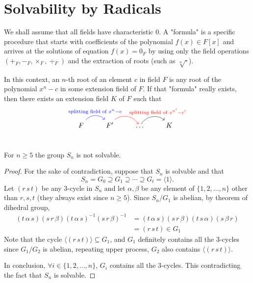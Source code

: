 \section{Solvability by Radicals}

We shall assume that all fields have characteristic $0$. A "formula" is a specific procedure 
that starts with coefficients of the polynomial $f(x) \in F[x]$ and arrives at the solutions of equation
$f(x) = 0_F$ by using only the field operations $(+_F, -_F, \times_F, \div_F)$ and the extraction 
of roots (such as $\sqrt[n]{\cdot}$).

In this context, an $n$-th root of an element $c$ in field $F$ is any root of the polynomial 
$x^n - c$ in some extension field of $F$. If that "formula" really exists, then there exists 
an extension field $K$ of $F$ such that 
\[
    \begin{tikzcd}
        F \arrow[r, blue, bend left=50, "\text{splitting field of } x^n - c"] & F' \arrow[r, red, bend left=50, "\text{splitting field of } x^{n'} - c'"]& \ldots \arrow[r, bend left=50]& K\\
    \end{tikzcd}
\]

\begin{theorem}
    For $n \geq 5$ the group $S_n$ is not solvable.
\end{theorem}
\begin{proof}
    For the sake of contradiction, suppose that 
    $S_n$ is solvable and that 
    \[
        S_n = G_0 \supseteq G_1 \supseteq \cdots \supseteq G_t = \langle 1 \rangle.
    \] 
    Let $(r\, s\, t)$ be any 3-cycle in $S_n$ and let $\alpha, \beta$ be any 
    element of $\{1, 2, \ldots, n\}$ other than $r, s, t$ (they always exist since $n \geq 5$).
    Since $S_n / G_1$ is abelian, by theorem of dihedral group,
    \begin{align*}
        (t\, \alpha\, s)(s\, r\, \beta)(t\, \alpha\, s)^{-1} (s\, r\, \beta)^{-1} &= 
        (t\, \alpha\, s)(s\, r\, \beta)(t\, s\, \alpha)(s\, \beta\, r)\\
        &= (r\, s\, t) \in G_1
    \end{align*}
    Note that the cycle $\langle (r\, s\, t) \rangle \subseteq G_1$, and $G_1$ definitely contains all the 3-cycles 
    since $G_1/G_2$ is abelian, repeating upper process, $G_2$ also contains $\langle (r\, s\, t) \rangle$.
    
    In conclusion, $\forall i \in \{1,2,\ldots, n\}$, $G_i$ contains all the 3-cycles. This contradicting the fact 
    that $S_n$ is solvable.
\end{proof}

